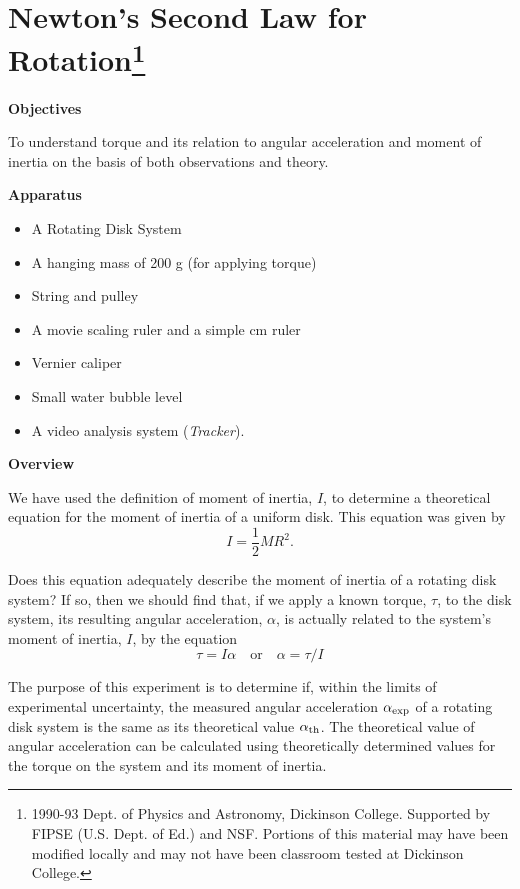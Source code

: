\section{Newton's Second Law for Rotation\footnote{
1990-93 Dept. of Physics and Astronomy, Dickinson College. Supported by FIPSE
(U.S. Dept. of Ed.) and NSF. Portions of this material may have been modified
locally and may not have been classroom tested at Dickinson College.
}}

\makelabheader %

\medskip
\textbf{Objectives} 

To understand torque and its relation to angular acceleration and moment of
inertia on the basis of both observations and theory. 

\medskip
\textbf{Apparatus}

\begin{itemize} [nosep]
\item A Rotating Disk System 
\item A hanging mass of 200 g (for applying torque) 
\item String and pulley
\item A movie scaling ruler and a simple cm ruler
\item Vernier caliper
\item Small water bubble level
\item A video analysis system (\textit{Tracker}).
\end{itemize}
\textbf{Overview} 

We have used the definition of moment of inertia, $I$, to determine a theoretical equation for the moment of inertia of a uniform disk. This equation was given by
\[
I=\frac{1}{2}MR^{2}.\]


Does this equation adequately describe the moment of inertia of a rotating
disk system? If so, then we should find that, if we apply a known torque, \( \tau  \), to the disk system, its resulting angular acceleration, \( \alpha  \), is actually related to the system's moment of inertia, $I$, by the equation
\[
\tau =I\alpha \quad \mbox{or}\quad \alpha =\tau /I\]


The purpose of this experiment is to determine if, within the limits of experimental
uncertainty, the measured angular acceleration $\alpha _{\rm exp}$ of a rotating disk system is
the same as its theoretical value $\alpha _{\rm th}$. The theoretical value of angular acceleration can be calculated using theoretically determined values for the torque on the
system and its moment of inertia.

